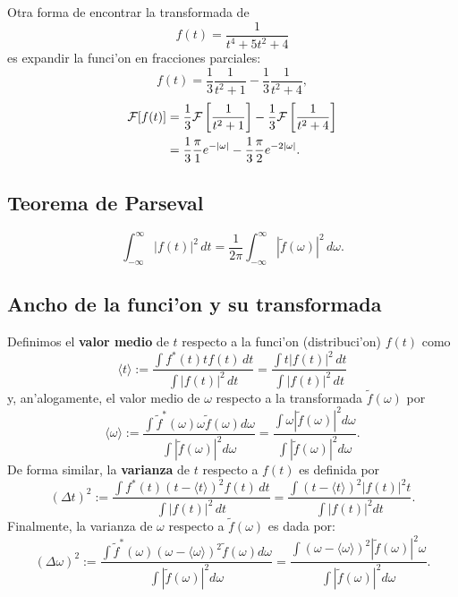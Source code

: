 Otra forma de encontrar la transformada de
\begin{equation}
f(t) =\frac{1}{t^4 + 5 t^2 + 4}
\end{equation}
es expandir la funci'on en fracciones parciales:
\begin{equation}
f(t) =\frac{1}{3}\frac{1}{t^2 + 1} -\frac{1}{3}\frac{1}{t^2 + 4},
\end{equation}
\begin{align}
{\cal F}[f(t)]
&=\frac{1}{3}{\cal F}\left[\frac{1}{t^2 + 1}\right]
-\frac{1}{3}{\cal F}\left[\frac{1}{t^2+4}\right]\\
&=\frac{1}{3}\frac{\pi}{1} e^{-|\omega|} -\frac{1}{3}\frac{\pi}{2} e^{-2|\omega|}.
\end{align}        

\subsection{Teorema de Parseval}
\begin{equation}
\boxed{
\int_{-\infty}^\infty |f(t)|^2\,dt=\frac{1}{2\pi}\int_{-\infty}^\infty |\tilde{f}(\omega)|^2\,d\omega.
 }
\end{equation}
    
\subsection{Ancho de la funci'on y su transformada}

Definimos el \textbf{valor medio} de $t$ respecto a la funci'on (distribuci'on) $f(t)$ como
\begin{equation}
\langle t \rangle:=\frac{\int f^{*}(t) t f(t)\,dt}{\int |f(t)|^{2}\, dt}=\frac{\int t |f(t)|^2\,dt}{\int |f(t)|^2\,dt}
\end{equation}
y, an'alogamente, el valor medio de $\omega$ respecto a la transformada $\tilde{f}(\omega)$ por
\begin{equation}
\langle \omega \rangle:=\frac{\int \tilde{f}^{*}(\omega) \omega \tilde{f}(\omega) d\omega}{\int |\tilde{f}(\omega)|^{2} d\omega}=\frac{\int \omega |\tilde{f}(\omega)|^2 d\omega}{\int |\tilde{f}(\omega)|^2 d\omega}.
\end{equation}
De forma similar, la \textbf{varianza} de $t$ respecto a $f(t)$ es definida por
\begin{equation}
(\Delta t)^2:=\frac{\int f^{*}(t)(t-\langle t \rangle)^2 f(t)\,dt}{\int |f(t)|^2\, dt}=\frac{\int (t- \langle t \rangle)^2 |f(t)|^2 t}{\int |f(t)|^2 dt}.
\end{equation}
Finalmente, la varianza de $\omega$ respecto a $\tilde{f}(\omega)$ es dada por:
\begin{equation}
(\Delta \omega)^2:=\frac{\int \tilde{f}^{*}(\omega)(\omega-\langle \omega \rangle)^2 \tilde{f}( \omega) d\omega}{\int |\tilde{f}(\omega)|^2 d\omega}=\frac{\int (\omega- \langle \omega \rangle)^2 |\tilde{f}(\omega)|^2 \omega}{\int |\tilde{f}(\omega)|^2 d\omega}.
\end{equation}


